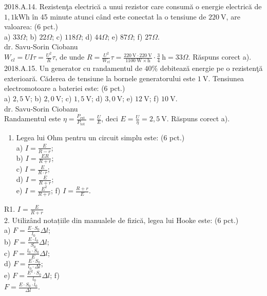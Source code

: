 2018.A.14. Rezistenţa electrică a unui rezistor care consumă o energie electrică de $1,1 \mathrm{kWh}$ în 45 minute atunci când este conectat la o tensiune de $220 \mathrm{~V}$, are valoarea: (6 pct.)\\ a) $33 \Omega$; b) $22 \Omega$; c) $118 \Omega$; d) $44 \Omega$; e) $87 \Omega$; f) $27 \Omega$.\\ dr. Savu-Sorin Ciobanu\\  $W_{e l}=U I \tau=\frac{U^{2}}{R} \tau$, de unde $R=\frac{U^{2}}{W_{e l}} \tau=\frac{220 \mathrm{~V} \cdot 220 \mathrm{~V}}{1100 \mathrm{~W} \times \mathrm{h}} \cdot \frac{3}{4} \mathrm{~h}=33 \Omega$. Răspuns corect a).\\

2018.A.15. Un generator cu randamentul de $40 \%$ debitează energie pe o rezistenţă exterioară. Căderea de tensiune la bornele generatorului este $1 \mathrm{~V}$. Tensiunea electromotoare a bateriei este: (6 pct.)\\ a) $2,5 \mathrm{~V}$; b) $2,0 \mathrm{~V}$; c) $1,5 \mathrm{~V}$; d) $3,0 \mathrm{~V}$; e) $12 \mathrm{~V}$; f) $10 \mathrm{~V}$.\\ dr. Savu-Sorin Ciobanu\\ Randamentul este $\eta=\frac{P_{\text {ext }}}{P_{\text {tot }}}=\frac{U}{E}$, deci $E=\frac{U}{\eta}=2,5 \mathrm{~V}$. Răspuns corect a).\\


\begin{enumerate}
  \item Legea lui Ohm pentru un circuit simplu este: (6 pct.)\\
a) $I=\frac{E}{R-r}$;\\
b) $I=\frac{E R}{R+r}$;\\
c) $I=\frac{E}{R \cdot r}$;\\
d) $I=\frac{E}{R+r}$;\\
e) $I=\frac{E^{2}}{R+r}$; f) $I=\frac{R+r}{E}$.
\end{enumerate}

R1. $I=\frac{E}{R+r}$\\
2. Utilizând notațiile din manualele de fizică, legea lui Hooke este: (6 pct.)\\
a) $F=\frac{E \cdot S_{0}}{l_{0}} \Delta l$;\\
b) $F=\frac{E \cdot l_{0}}{S_{0}} \Delta l$;\\
c) $F=\frac{l_{0} \cdot S_{0}}{E} \Delta l$;\\
d) $F=\frac{E \cdot S_{0}}{l_{0} \cdot \Delta l}$;\\
e) $F=\frac{E^{2} \cdot S_{0}}{l_{0}} \Delta l$; f)\\
$F=\frac{E \cdot S_{0} \cdot l_{0}}{\Delta l}$.

